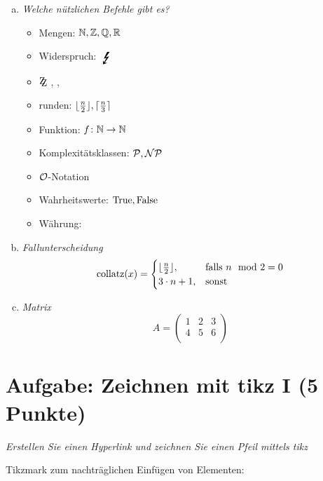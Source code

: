 \begin{enumerate}[a)]
\item {\itshape Welche nützlichen Befehle gibt es?}		%
	\begin{itemize}\setlength{\itemsep}{-1ex}				%
	\item Mengen: $\mathbb{N}, \mathbb{Z}, \mathbb{Q}, \mathbb{R}$
	\item Widerspruch: $\Bolt$
	\item $\zz$, \gdw, \oBdA
	\item runden: $\lfloor{\frac{n}{2}}\rfloor, \lceil{\frac{n}{3}}\rceil$
	\item Funktion: $f \colon \mathbb{N} \to \mathbb{N}$
	\item Komplexitätsklassen: $\mathcal{P}, \mathcal{NP}$
	\item $\operatorname{\mathcal{O}}$-Notation
	\item Wahrheitswerte: $\operatorname{True}, \operatorname{False}$
	\item Währung: \Eu
	\end{itemize}

\item {\itshape Fallunterscheidung}						%
	\[ \text{collatz}(x) = \begin{cases}
			         \lfloor{\frac{n}{2}}\rfloor, & \text{falls } n \mod 2 = 0 \\
			         3\cdot n+1, & \text{sonst} \\
	                \end{cases}
	\]
	
\item {\itshape Matrix}										%
	\[ A = \begin{pmatrix}
		1 & 2 & 3 \\
		4 & 5 & 6 \\
	\end{pmatrix}
	\]
\end{enumerate}

\section{Aufgabe: Zeichnen mit tikz I \hfill (5 Punkte)}
{\itshape Erstellen Sie einen Hyperlink und zeichnen Sie einen Pfeil mittels tikz}

Tikzmark zum nachträglichen Einfügen von Elementen:

